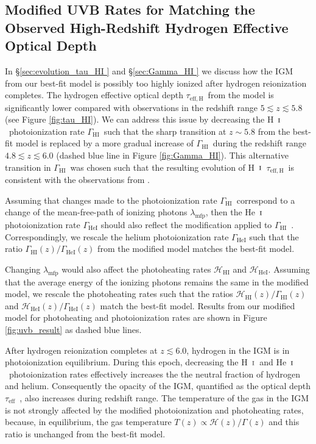 \documentclass[twocolumn]{aastex62}
\def\HI{\hbox{\rm H~$\scriptstyle\rm I$}}
\def\HeI{\hbox{He~$\scriptstyle\rm I$}}
\newcommand\taueff{$\tau_{\mathrm{eff}}$~}
\newcommand\GammaHI{$\Gamma_{\mathrm{HI}}$~}
\newcommand\taueffH{$\tau_{\mathrm{eff,H}}$~}
\begin{document}
\subsection{Modified UVB Rates for Matching the Observed High-Redshift Hydrogen Effective Optical Depth}
\label{sec:modified_uvb_model}

In \S \ref{sec:evolution_tau_HI } and \S \ref{sec:Gamma_HI } we discuss how 
the IGM from our best-fit model is possibly
too highly ionized after hydrogen reionization completes.
The hydrogen effective optical depth \taueffH from the model is
significantly lower compared with observations in the redshift range $5 \lesssim z \lesssim 5.8$ (see Figure \ref{fig:tau_HI}).
We can 
address this issue by decreasing the \HI\ photoionization rate \GammaHI such that the sharp transition
at $z\sim 5.8$ from the best-fit 
model is replaced by a more gradual increase of \GammaHI during the redshift range
$4.8 \lesssim z \lesssim 6.0$ (dashed blue line in Figure \ref{fig:Gamma_HI}). 
This alternative transition in \GammaHI was chosen such that
the resulting evolution of \HI\ \taueffH is consistent with the observations
from \cite{Bosman_2018}. 


Assuming that changes made to the photoionization rate \GammaHI correspond to a change of the mean-free-path 
of ionizing photons $\lambda_\mathrm{mfp}$, then the \HeI photoionization rate $\Gamma_\mathrm{HeI}$ 
should also reflect the modification applied to \GammaHI.
Correspondingly, we rescale the helium photoionization rate $\Gamma_\mathrm{HeI}$ such that
the ratio
$\Gamma_\mathrm{HI}(z) / \Gamma_\mathrm{HeI}(z) $ from the modified model matches the best-fit model.

Changing $\lambda_\mathrm{mfp}$ would also affect the photoheating rates
$\mathcal{H}_\mathrm{HI}$ and $\mathcal{H}_\mathrm{HeI}$.
Assuming 
that the average energy of the ionizing photons remains the same in the modified model,
we rescale the photoheating rates such that the  
ratios $\mathcal{H}_\mathrm{HI}(z) / \Gamma_\mathrm{HI}(z) $  and $\mathcal{H}_\mathrm{HeI}(z) / \Gamma_\mathrm{HeI}(z)$
match the best-fit model.
Results from our modified model for photoheating and photoionization rates are shown in
Figure \ref{fig:uvb_result} as dashed blue lines.

After hydrogen reionization completes at
$z \lesssim 6.0$,
hydrogen in the IGM is in photoionization equilibrium.
During this epoch, decreasing the \HI\ and \HeI\ photoionization 
rates effectively increases the the neutral fraction of hydrogen and helium.
Consequently the opacity of the IGM, quantified as the optical depth \taueff, also increases during 
redshift range.
The temperature of the gas in the IGM is not strongly affected by the modified photoionization and photoheating rates,
because, in equilibrium, the 
gas temperature $T(z) \propto \mathcal{H}(z) / \Gamma(z)$ and this ratio is unchanged
from the best-fit model. 
\end{document}
